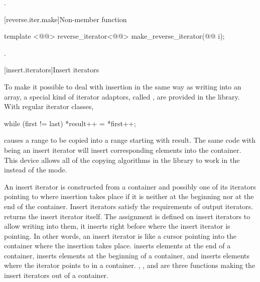 \begin{itemdescr}
\pnum
\returns
{}.
\end{itemdescr}

[reverse.iter.make]{Non-member function }

%
\begin{itemdecl}
template <@@>
  reverse_iterator<@@> make_reverse_iterator(@@ i);
\end{itemdecl}

\begin{itemdescr}
\pnum
\returns
{}.
\end{itemdescr}

[insert.iterators]{Insert iterators}

\pnum
To make it possible to deal with insertion in the same way as writing into an array, a special kind of iterator
adaptors, called
,
are provided in the library.
With regular iterator classes,

\begin{codeblock}
while (first != last) *result++ = *first++;
\end{codeblock}

causes a range 
to be copied into a range starting with result.
The same code with
being an insert iterator will insert corresponding elements into the container.
This device allows all of the
copying algorithms in the library to work in the
instead of the  mode.

\pnum
An insert iterator is constructed from a container and possibly one of its iterators pointing to where
insertion takes place if it is neither at the beginning nor at the end of the container.
Insert iterators satisfy the requirements of output iterators.
returns the insert iterator itself.
The assignment
is defined on insert iterators to allow writing into them, it inserts
right before where the insert iterator is pointing.
In other words, an insert iterator is like a cursor pointing into the
container where the insertion takes place.
inserts elements at the end of a container,
inserts elements at the beginning of a container, and
inserts elements where the iterator points to in a container.
,
,
and
are three
functions making the insert iterators out of a container.

